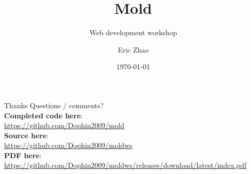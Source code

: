 \documentclass[xcolor={dvipsnames},xtable]{beamer}
\title{Mold}
\subtitle{Web development workshop}
\date{\today}
\author{Eric Zhao}
\begin{document}

\newcommand{\sectiontitle}{}
\newcommand{\currenttitle}{}

\maketitle

\newcommand{\subdir}{sections}
\newcommand{\emojisubdir}{emojisub}
\newcommand{\templatedir}{template}


\renewcommand{\currenttitle}{Thanks}
\begin{frame}{\currenttitle}
  Questions / comments? \\[3em]

  \textbf{Completed code here}: \\
  {\scriptsize \url{https://github.com/Dophin2009/mold}} \\[1em]

  \textbf{Source here}: \\
  {\scriptsize \url{https://github.com/Dophin2009/moldws}} \\[1em]

  \textbf{PDF here}: \\
  {\scriptsize \url{https://github.com/Dophin2009/moldws/releases/download/latest/index.pdf}}
\end{frame}
\end{document}
